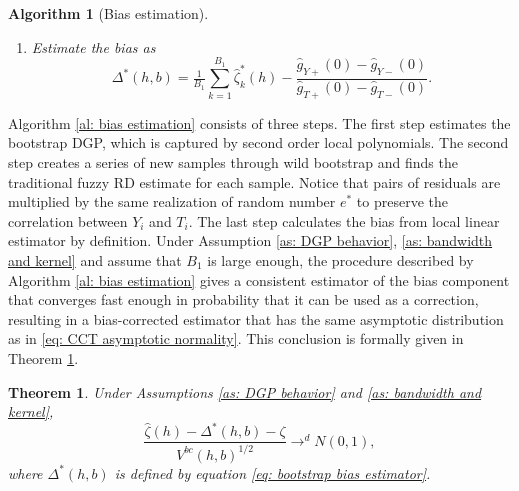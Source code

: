 \documentclass[12pt,]{article}
\newtheorem{theorem}{Theorem}
\newtheorem{algorithm}{Algorithm}
\DeclareMathOperator{\1}{\mathbbm{1}}
\DeclareMathOperator*{\argmin}{arg\,min}
\begin{document}
\begin{algorithm}[Bias estimation]
\begin{enumerate}
\begin{enumerate}
\begin{align*}
			&= \argmin_{\mu} \min_{\beta} \sum_{i =1}^n
			(Z_i^* - \mu - \beta X_i)^2 K_{-,h}(X_{i}) \\
			\hat\mu_{Z+}^*(h)
			&= \argmin_{\mu} \min_{\beta} \sum_{i = 1}^n
			(Z_i^* - \mu - \beta X_i)^2 K_{+,h}(X_{i}).
			\end{align*}
			\item Save $\hat\zeta^*_k(h) = \frac{\hat\mu_{Y+}^*(h) - \hat\mu_{Y-}^*(h)}{\hat\mu_{T+}^*(h) - \hat\mu_{T-}^*(h)}$.
		\end{enumerate}
		\item Estimate the bias as
		\begin{equation}
		\label{eq: bootstrap bias estimator}
		\Delta^*(h,b) = \tfrac{1}{B_1} \sum_{k=1}^{B_1} \hat\zeta^*_k(h) -
		\frac{\hat g_{Y+}(0) - \hat g_{Y-}(0)}{\hat g_{T+}(0) - \hat g_{T-}(0)}.
		\end{equation}
	\end{enumerate}
\end{algorithm}

Algorithm \ref{al: bias estimation} consists of three steps. The first step estimates the bootstrap DGP, which is captured by second order local polynomials. The second step creates a series of new samples through wild bootstrap and finds the traditional fuzzy RD estimate for each sample. Notice that pairs of residuals are multiplied by the same realization of random number $e^*$ to preserve the correlation between $Y_i$ and $T_i$. The last step calculates the bias from local linear estimator by definition. Under Assumption \ref{as: DGP behavior}, \ref{as: bandwidth and kernel} and assume that $B_1$ is large enough, the procedure described by Algorithm \ref{al: bias estimation} gives a consistent estimator of the bias component that converges fast enough in probability that it can be used as a correction, resulting in a bias-corrected estimator that has the same asymptotic distribution as in \eqref{eq: CCT asymptotic normality}. This conclusion is formally given in Theorem \ref{th: bootstrap bias correction}.

\begin{theorem}
	\label{th: bootstrap bias correction}
	Under Assumptions \ref{as: DGP behavior} and \ref{as: bandwidth and kernel},
	\begin{equation}
	\label{eq: theorem bootstrap bias correction}
	\frac{\hat\zeta(h) - \Delta^{*}(h,b) - \zeta}{ V^{bc}(h, b)^{1/2}}
	\to^{d} N(0,1),
	\end{equation}
	where $\Delta^*(h,b)$ is defined by equation \eqref{eq: bootstrap bias estimator}.
\end{theorem}
\end{document}
